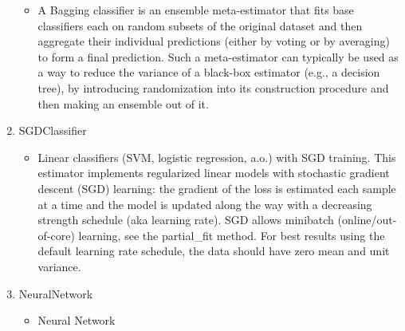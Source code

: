 \begin{enumerate}
\begin{itemize}
            \item A Bagging classifier is an ensemble meta-estimator that fits base classifiers each on random subsets of the original dataset and then aggregate their individual predictions (either by voting or by averaging) to form a final prediction. Such a meta-estimator can typically be used as a way to reduce the variance of a black-box estimator (e.g., a decision tree), by introducing randomization into its construction procedure and then making an ensemble out of it.
        \end{itemize}
    \item SGDClassifier
        \begin{itemize}
            \item Linear classifiers (SVM, logistic regression, a.o.) with SGD training. This estimator implements regularized linear models with stochastic gradient descent (SGD) learning: the gradient of the loss is estimated each sample at a time and the model is updated along the way with a decreasing strength schedule (aka learning rate). SGD allows minibatch (online/out-of-core) learning, see the partial\_fit method. For best results using the default learning rate schedule, the data should have zero mean and unit variance.
        \end{itemize}
    \item NeuralNetwork
        \begin{itemize}
            \item Neural Network
        \end{itemize}
\end{enumerate}

